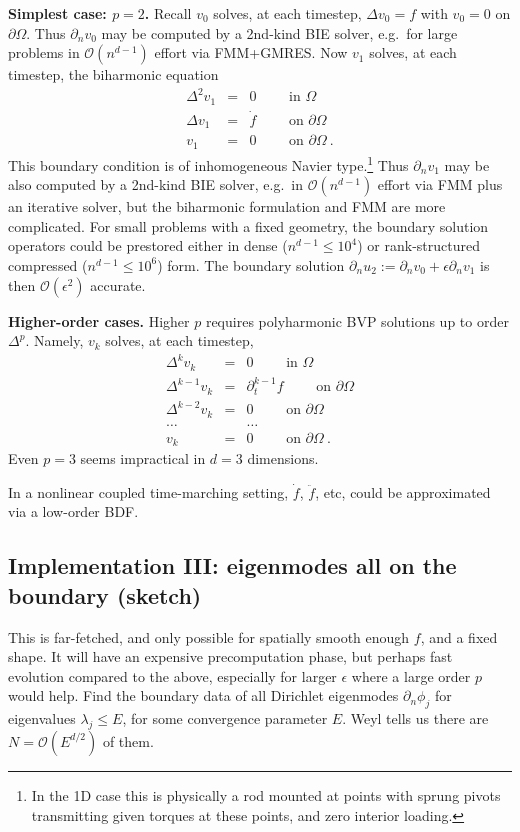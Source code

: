 \documentclass[10pt]{article}
\newcommand{\bea}{\begin{eqnarray}}
\newcommand{\eea}{\end{eqnarray}}
\newcommand{\bigO}{{\mathcal O}}
\newcommand{\pO}{{\partial\Omega}}
\newcommand{\eps}{\epsilon}
\newcommand{\dn}{\partial_n}
\newcommand{\dt}{\partial_t}
\begin{document}
{\bf Simplest case: $p=2$.}
Recall $v_0$ solves, at each timestep, $\Delta v_0 = f$ with $v_0=0$ on $\pO$.
Thus $\dn v_0$ may be computed by a 2nd-kind BIE solver, e.g.\ for large problems in $\bigO(n^{d-1})$ effort via FMM+GMRES.
Now $v_1$ solves, at each timestep, the biharmonic equation
\bea
\Delta^2 v_1 &=& 0 \qquad \mbox{ in } \Omega
\\
\Delta v_1 &=& \dot f \qquad \mbox{ on } \pO
\\
v_1 &=& 0 \qquad \mbox{ on } \pO~.
\eea
This boundary condition is of inhomogeneous Navier type.\footnote{In the 1D case this is physically a rod mounted at points with sprung pivots transmitting given torques at these points, and zero interior loading.}
Thus $\dn v_1$ may be also computed by a 2nd-kind BIE solver, e.g.\ in $\bigO(n^{d-1})$ effort via FMM plus an iterative solver, but the biharmonic formulation and FMM are more complicated.
For small problems with a fixed geometry, the boundary solution operators
could be prestored either in dense ($n^{d-1} \le 10^4$)
or rank-structured compressed
($n^{d-1} \le 10^6$) form.
The boundary solution $\dn u_2 := \dn v_0 + \eps \dn v_1$ is then $\bigO(\eps^2)$
accurate.

{\bf Higher-order cases.}
Higher $p$ requires polyharmonic BVP solutions up to order $\Delta^p$.
Namely, $v_k$ solves, at each timestep,
\bea
\Delta^k v_k &=& 0 \qquad \mbox{ in } \Omega
\\
\Delta^{k-1} v_k &=& \dt^{k-1} f \qquad \mbox{ on } \pO
\\
\Delta^{k-2} v_k &=& 0 \qquad \mbox{ on } \pO
\\
\dots &&\dots
\\
v_k &=& 0 \qquad \mbox{ on } \pO~.
\eea
Even $p=3$ seems impractical in $d=3$ dimensions.

In a nonlinear coupled time-marching setting,
$\dot f$, $\ddot f$, etc, could be approximated via a low-order
BDF.

\subsection{Implementation III: eigenmodes all on the boundary (sketch)}

This is far-fetched, and only possible for spatially smooth enough $f$,
and a fixed shape.
It will have an expensive precomputation phase,
but perhaps fast evolution compared to the above,
especially for larger $\eps$ where a large order $p$ would help.
Find the boundary data of all Dirichlet eigenmodes $\dn \phi_j$
for eigenvalues $\lambda_j \le E$, for some convergence parameter $E$.
Weyl tells us there are $N=\bigO(E^{d/2})$ of them.
\end{document}

